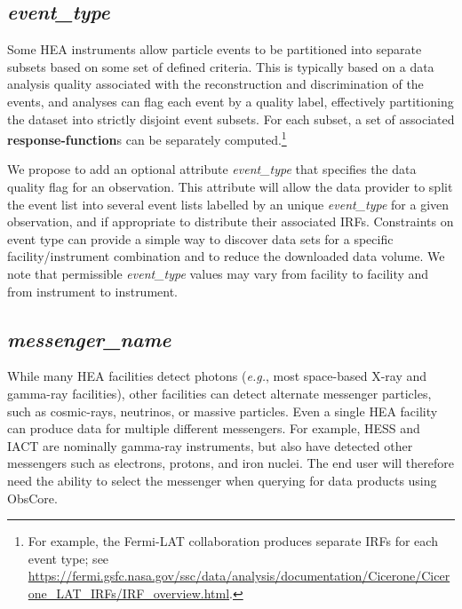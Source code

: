 \documentclass[11pt,a4paper]{ivoa}
\begin{document}
\subsection{{\em event\_type}}
\label{sec:evttype}

Some \gls{HEA} instruments allow particle events to be partitioned into separate subsets based on some set of defined criteria.  This is typically based on a data analysis quality associated with the reconstruction and  discrimination of the events, and analyses can flag each event by a quality label, effectively partitioning the dataset into strictly disjoint event subsets. For each subset, a set of associated {\bf response-function}s can be separately computed.\footnote{For example, the Fermi-LAT collaboration produces separate \glspl{IRF} for each event type; see \url{https://fermi.gsfc.nasa.gov/ssc/data/analysis/documentation/Cicerone/Cicerone_LAT_IRFs/IRF_overview.html}.}

We propose to add an optional attribute {\em event\_type\/} that specifies the data quality flag for an observation. This attribute will allow the data provider to split the event list into several event lists labelled by an unique {\em event\_type\/} for a given observation, and if appropriate to distribute their associated \glspl{IRF}. Constraints on event type can provide a simple way to discover data sets for a specific facility/instrument combination and to reduce the downloaded data volume. We note that permissible {\em event\_type\/} values may vary from facility to facility and from instrument to instrument.


\subsection{{\em messenger\_name}}
\label{sec:messenger}

While many \gls{HEA} facilities detect photons ({\em e.g.\/}, most space-based X-ray and gamma-ray facilities), other facilities can detect alternate messenger particles, such as cosmic-rays, neutrinos, or massive particles.  Even a single \gls{HEA} facility can produce data for multiple different messengers.  For example, \gls{HESS} and \gls{IACT} are nominally gamma-ray instruments, but also have detected other messengers such as electrons, protons, and iron nuclei. The end user will therefore need the ability to select the messenger when querying for data products using Obs\-Core.
\end{document}
